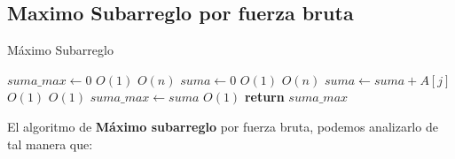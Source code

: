 \documentclass[12pt,twoside]{article}
\begin{document}
\subsection{\textbf{Maximo Subarreglo por fuerza bruta}}
\begin{algorithm}[h]
  \caption{Máximo Subarreglo}\label{euclid}
  \begin{algorithmic}[1]
    \State $suma\_max \gets 0$                              \Comment $O(1)$
                     \Comment $O(n)$                      
      \State $suma \gets 0$                                 \Comment $O(1)$              
                    \Comment $O(n)$
        \State $suma \gets suma + A[j]$                     \Comment $O(1)$
                                     \Comment $O(1)$
          \State $suma\_max \gets suma$                     \Comment $O(1)$
        \EndIf
      \EndFor                                 
    \EndFor
    \State \textbf{return} $suma\_max$
  \EndFunction
  \end{algorithmic}
\end{algorithm}

El algoritmo de \textbf{Máximo subarreglo} por fuerza bruta, podemos analizarlo de tal manera que:
\end{document}
